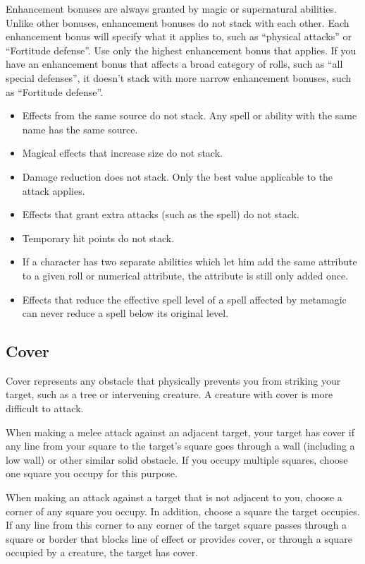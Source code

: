  Enhancement bonuses are always granted by magic or supernatural abilities. Unlike other bonuses, enhancement bonuses do not stack with each other. Each enhancement bonus will specify what it applies to, such as ``physical attacks'' or ``Fortitude defense''. Use only the highest enhancement bonus that applies. If you have an enhancement bonus that affects a broad category of rolls, such as ``all special defenses'', it doesn't stack with more narrow enhancement bonuses, such as ``Fortitude defense''.


\begin{itemize}
    \item Effects from the same source do not stack. Any spell or ability with the same name has the same source. 
    \item Magical effects that increase size do not stack.
    \item Damage reduction does not stack. Only the best value applicable to the attack applies.
    \item Effects that grant extra attacks (such as the  spell) do not stack.
    \item Temporary hit points do not stack.
    \item If a character has two separate abilities which let him add the same attribute to a given roll or numerical attribute, the attribute is still only added once.
    \item Effects that reduce the effective spell level of a spell affected by metamagic can never reduce a spell below its original level.
\end{itemize}

\subsection{Cover}\label{Cover}

Cover represents any obstacle that physically prevents you from striking your target, such as a tree or intervening creature. A creature with cover is more difficult to attack.

 When making a melee attack against an adjacent target, your target has cover if any line from your square to the target's square goes through a wall (including a low wall) or other similar solid obstacle. If you occupy multiple squares, choose one square you occupy for this purpose.

When making an attack against a target that is not adjacent to you, choose a corner of any square you occupy. In addition, choose a square the target occupies. If any line from this corner to any corner of the target square passes through a square or border that blocks line of effect or provides cover, or through a square occupied by a creature, the target has cover.

